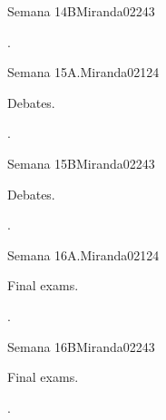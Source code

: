 \begin{syllabus}
\begin{unit}{Semana 14B}{}{Miranda02}{24}{3}
   \begin{learningoutcomes}
      \item . 
      \end{learningoutcomes}
\end{unit}

\begin{unit}{Semana 15A.}{}{Miranda02}{12}{4}
   \begin{topics}
      \item Debates.
   \end{topics}
   \begin{learningoutcomes}
      \item .
   \end{learningoutcomes}
\end{unit}

\begin{unit}{Semana 15B}{}{Miranda02}{24}{3}
   \begin{topics}
      \item Debates.
   \end{topics}

   \begin{learningoutcomes}
      \item . 
      \end{learningoutcomes}
\end{unit}

\begin{unit}{Semana 16A.}{}{Miranda02}{12}{4}
   \begin{topics}
      \item Final exams.
   \end{topics}
   \begin{learningoutcomes}
      \item .
   \end{learningoutcomes}
\end{unit}

\begin{unit}{Semana 16B}{}{Miranda02}{24}{3}
   \begin{topics}
      \item Final exams.
   \end{topics}

   \begin{learningoutcomes}
      \item . 
      \end{learningoutcomes}
\end{unit}


\begin{coursebibliography}
\end{coursebibliography}

\end{syllabus}
